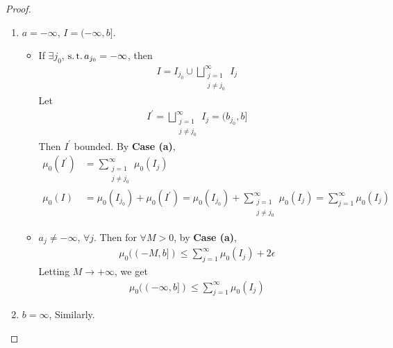 \begin{enumerate}
\begin{proof}
\begin{enumerate}
\begin{enumerate}
					\vspace*{4em}
					
					\item $a = -\infty$, $I = (-\infty , b]$.
					\begin{itemize}
						\item If $\exists j_0$, $\operatorname{s.t.} a_{j_0} = -\infty$, then
						\begin{align}
							I = I_{j_0} \cup \bigsqcup_{\substack{j = 1 \\ j \neq j_0}}^{\infty}{I_j}
						\end{align}
						Let
						\begin{align}
							I^{'} = \bigsqcup_{\substack{j = 1 \\ j \neq j_0}}^{\infty}{I_j} = (b_{j_0} , b]
						\end{align}
						Then $I^{'}$ bounded. By \textbf{Case (a)}, 
						\begin{align}
							\mu_0(I^{'}) &= \sum_{\substack{j = 1 \\ j \neq j_0}}^{\infty}{\mu_0(I_j)} \\
							\mu_0(I) &= \mu_0(I_{j_0}) + \mu_0(I^{'}) 
							= \mu_0(I_{j_0}) + \sum_{\substack{j = 1 \\ j \neq j_0}}^{\infty}{\mu_0(I_j)} 
							= \sum_{j = 1}^{\infty}{\mu_0(I_j)}
						\end{align}
						
						\newpage
						
						\item $a_{j} \neq -\infty$, $\forall j$. Then for $\forall M > 0$, by \textbf{Case (a)},
						\begin{align}
							\mu_0((-M , b]) \leq \sum_{j = 1}^{\infty}{\mu_0(I_j)} + 2\epsilon
						\end{align}
						Letting $M \to +\infty$, we get
						\begin{align}
							\mu_0((-\infty , b]) \leq \sum_{j = 1}^{\infty}{\mu_0(I_j)}
						\end{align}
					\end{itemize}
					
					\vspace*{6em}
					
					\item $b = \infty$, Similarly.
				\end{enumerate}
			\end{enumerate}
		\end{proof}
		
		\newpage


\end{enumerate}
